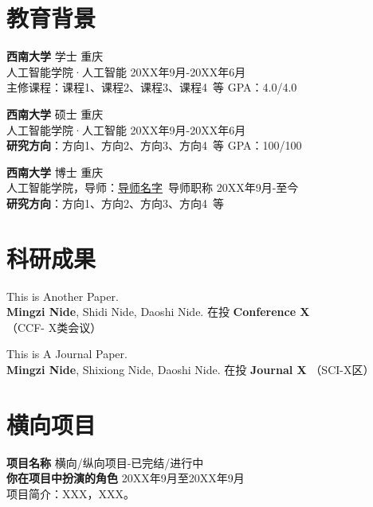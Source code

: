     \section{\makebox[\widthof{\faGraduationCap}][c]{\color{SWU_Blue}{\faGraduationCap}}\quad 教育背景}

    {\large \textbf{西南大学}}  学士 \hfill {重庆} \\
    {{人工智能学院}}·人工智能 \hfill {20XX年9月-20XX年6月} \\
    {主修课程}：课程1、课程2、课程3、课程4\ 等
    \hfill {GPA}：4.0/4.0

    \vspace{0.5em}
    {\large \textbf{西南大学}}  硕士 \hfill {重庆} \\
    {{人工智能学院}}·人工智能 \hfill {20XX年9月-20XX年6月} \\
    \textbf{研究方向}：方向1、方向2、方向3、方向4\ 等
    \hfill {GPA}：100/100

    \vspace{0.5em}
    {\large \textbf{西南大学}}  博士 \hfill {重庆} \\
    {{人工智能学院}}，导师：\href{导师的个人主页.site}{导师名字}\ 导师职称 \hfill {20XX年9月-至今} \\
    \textbf{研究方向}：方向1、方向2、方向3、方向4\ 等


    \section{\makebox[\widthof{\faGraduationCap}][c]{\color{SWU_Blue}{\faFlask}}\quad 科研成果}
    
    \vspace{0.5em}
    This is Another Paper. \\
    \textbf{Mingzi Nide}, Shidi Nide, Daoshi Nide. \hfill 
    在投 \textbf{Conference X} （CCF- X类会议）

    \vspace{0.5em}
    This is A Journal Paper.\\
    \textbf{Mingzi Nide}, Shixiong Nide, Daoshi Nide. \hfill 
    在投 \textbf{Journal X} （SCI-X区）


    \section{\makebox[\widthof{\faChalkboardTeacher}][c]{\color{SWU_Blue}{\faChalkboardTeacher}}\quad 横向项目}
    \vspace{0.5em}
    {\large{\textbf{项目名称}}} \hfill {横向/纵向项目-已完结/进行中}\\
    \textbf{你在项目中扮演的角色} \hfill 20XX年9月至20XX年9月\\
    项目简介：XXX，XXX。
    
